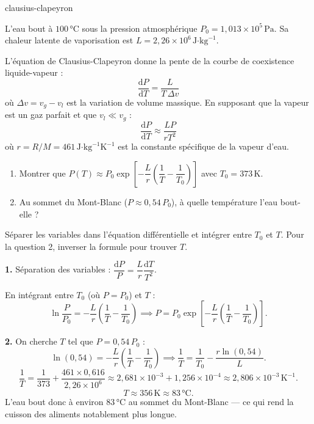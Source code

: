 
\begin{exo}{clausius-clapeyron}

L'eau bout à $100\,°\text{C}$ sous la pression atmosphérique $P_0 = 1{,}013 \times 10^5\,\text{Pa}$. Sa chaleur latente de vaporisation est $L = 2{,}26 \times 10^6\,\text{J·kg}^{-1}$.

L'équation de Clausius-Clapeyron donne la pente de la courbe de coexistence liquide-vapeur :
$$\frac{\mathrm{d}P}{\mathrm{d}T} = \frac{L}{T\,\Delta v}$$
où $\Delta v = v_g - v_l$ est la variation de volume massique. En supposant que la vapeur est un gaz parfait et que $v_l \ll v_g$ :
$$\frac{\mathrm{d}P}{\mathrm{d}T} \approx \frac{LP}{rT^2}$$
où $r = R/M = 461\,\text{J·kg}^{-1}\text{K}^{-1}$ est la constante spécifique de la vapeur d'eau.

\begin{enumerate}
  \item Montrer que $P(T) \approx P_0 \exp\!\left[-\dfrac{L}{r}\!\left(\dfrac{1}{T} - \dfrac{1}{T_0}\right)\right]$ avec $T_0 = 373\,\text{K}$.
  \item Au sommet du Mont-Blanc ($P \approx 0{,}54\,P_0$), à quelle température l'eau bout-elle ?
\end{enumerate}

\begin{indication}
Séparer les variables dans l'équation différentielle et intégrer entre $T_0$ et $T$. Pour la question 2, inverser la formule pour trouver $T$.
\end{indication}

\begin{solution}
\textbf{1.} Séparation des variables : $\dfrac{\mathrm{d}P}{P} = \dfrac{L}{r}\dfrac{\mathrm{d}T}{T^2}$.

En intégrant entre $T_0$ (où $P = P_0$) et $T$ :
$$\ln\frac{P}{P_0} = -\frac{L}{r}\!\left(\frac{1}{T} - \frac{1}{T_0}\right) \implies P = P_0\exp\!\left[-\frac{L}{r}\!\left(\frac{1}{T}-\frac{1}{T_0}\right)\right].$$

\textbf{2.} On cherche $T$ tel que $P = 0{,}54\,P_0$ :
$$\ln(0{,}54) = -\frac{L}{r}\!\left(\frac{1}{T}-\frac{1}{T_0}\right) \implies \frac{1}{T} = \frac{1}{T_0} - \frac{r\ln(0{,}54)}{L}.$$
$$\frac{1}{T} = \frac{1}{373} + \frac{461 \times 0{,}616}{2{,}26\times10^6} \approx 2{,}681\times10^{-3} + 1{,}256\times10^{-4} \approx 2{,}806\times10^{-3}\,\text{K}^{-1}.$$
$$T \approx 356\,\text{K} \approx 83\,°\text{C}.$$
L'eau bout donc à environ $83\,°\text{C}$ au sommet du Mont-Blanc — ce qui rend la cuisson des aliments notablement plus longue.
\end{solution}

\end{exo}

